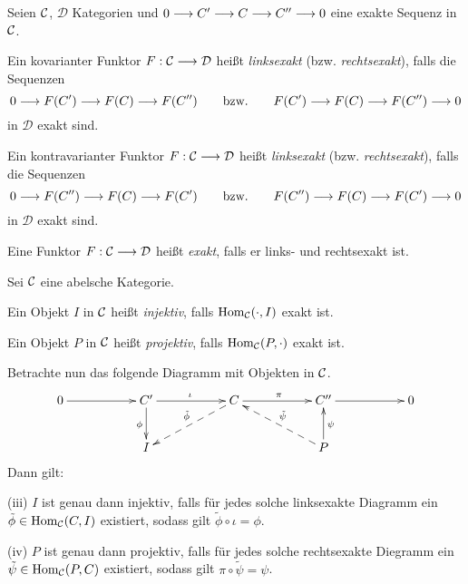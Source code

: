 \documentclass[11pt]{book}
\theoremstyle{nonumberbreak}
\newenvironment{er}[1][]{\ifthenelse{\equal{#1}{}}{\erinner}{\erinner[#1]}\rm}{\enderinner}
\newenvironment{definbem}[1][]{\ifthenelse{\equal{#1}{}}{\definibem}{\definibem[#1]}\rm}{\enddefinibem}
\newcommand{\Hom}{\mathrm{Hom} }
\begin{document}
\begin{spacing}{1.4}
\begin{er}
Seien $\mathcal{C}$, $\mathcal{D}$ Kategorien und $0 \longrightarrow C' \longrightarrow C \longrightarrow C'' \longrightarrow 0$ eine exakte Sequenz in $\mathcal{C}$.
\begin{compactenum}
\item Ein kovarianter Funktor $F: \mathcal{C} \longrightarrow \mathcal{D}$ heißt \textit{linksexakt} (bzw. \textit{rechtsexakt}), falls die Sequenzen
$$0 \longrightarrow F(C') \longrightarrow F(C) \longrightarrow F(C'') \qquad \textrm{bzw.} \qquad F(C') \longrightarrow F(C) \longrightarrow F(C'') \longrightarrow 0$$
in $\mathcal{D}$ exakt sind.
\item Ein kontravarianter Funktor $F: \mathcal{C} \longrightarrow \mathcal{D}$ heißt \textit{linksexakt} (bzw. \textit{rechtsexakt}), falls die Sequenzen
$$0 \longrightarrow F(C'') \longrightarrow F(C) \longrightarrow F(C') \qquad \textrm{bzw.} \qquad F(C'') \longrightarrow F(C) \longrightarrow F(C') \longrightarrow 0$$
in $\mathcal{D}$ exakt sind.
\item Eine Funktor $F: \mathcal{C} \longrightarrow \mathcal{D}$ heißt \textit{exakt}, falls er links- und rechtsexakt ist.
\end{compactenum}
\end{er}



\begin{definbem}

Sei $\mathcal{C}$ eine abelsche Kategorie.
\begin{compactenum}
\item Ein Objekt $I$ in $\mathcal{C}$ heißt \textit{injektiv}, falls $\Hom_{\C}(\cdot, I)$ exakt ist.
\item Ein Objekt $P$ in $\mathcal{C}$ heißt \textit{projektiv}, falls $\Hom_{\C}(P, \cdot)$ exakt ist.
\end{compactenum}
Betrachte nun das folgende Diagramm mit Objekten in $\mathcal{C}$.
$$
\begin{xy}
\xymatrix{
0 \ar[rr] && C' \ar[rr]^{\iota} \ar[d]_{\phi} && C \ar@{-->}[lld]_{\tilde{\phi}} \ar[rr]^{\pi} && C'' \ar[rr] && 0 \\
&& I && && P \ar[u]_{\psi} \ar@{-->}[llu]_{\tilde{\psi}} &&
}
\end{xy}
$$
Dann gilt:
\begin{compactenum}
\item[(iii)] $I$ ist genau dann injektiv, falls für jedes solche linksexakte Diagramm ein $\tilde{\phi} \in \Hom_{\C}(C,I)$ existiert, sodass gilt $\tilde{\phi} \circ \iota = \phi$.
\item[(iv)] $P$ ist genau dann projektiv, falls für jedes solche rechtsexakte Diegramm ein $\tilde{\psi} \in \Hom_{\C}(P,C)$ existiert, sodass gilt $\pi \circ \tilde{\psi} = \psi$.
\end{compactenum}



\end{definbem}
\end{spacing}
\end{document}

